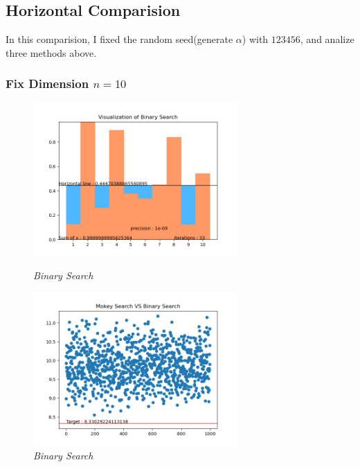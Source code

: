 \documentclass[12pt, a4paper, oneside]{article}
\begin{document}
\subsection{Horizontal Comparision}
In this comparision, I fixed the random seed(generate $\alpha$) with $123456$, and analize three methods above.

\subsubsection{Fix Dimension $n = 10$}
\begin{figure}[H]
    \begin{minipage}[H]{0.5\linewidth} %
            \centering
            \includegraphics[width=7.8cm]{V of B.png}
            \caption{\textit{Binary Search}}
     \end{minipage}
     \begin{minipage}[H]{0.5\linewidth}
        \hspace{0.2mm}
         \includegraphics[width=7.8cm]{M of B.png}
         \caption{\textit{Binary Search}}
      \end{minipage}
\end{figure}
\end{document}
